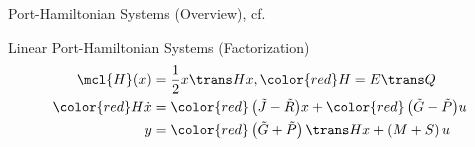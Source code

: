 \begin{frame}{Port-Hamiltonian Systems (Overview), cf.~\cite{Morandin2022}}
    \begin{block}{Linear Port-Hamiltonian Systems (Factorization)}
        \begin{align*}
            \mcl{H}(x) &= \frac{1}{2} x\trans H x, {\color{red}H = E\trans Q} \\
            {\color{red}H} \dot{x} &= {\color{red}\left( \tilde{J} - \tilde{R} \right)} x + {\color{red}\left( \tilde{G} - \tilde{P} \right)} u \\
            y &= {\color{red}\left( \tilde{G} + \tilde{P} \right)\trans} H x + \left( M + S \right) u
        \end{align*}
    \end{block}
\end{frame}

